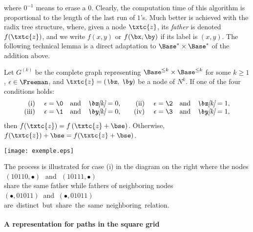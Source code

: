 \noindent where $0^{-1}$ means to erase a $0$. Clearly, the computation time of this algorithm  is proportional to the length of the last run of $1$'s.  Much better is achieved with  the radix tree structure, where, given a node $\txtc{z}$, its {\em father} is denoted  $f(\txtc{z})$, and we write $f(x,y)$ or $f(\bx,\by)$ if its label is $(x,y)$.
The following technical lemma is a direct  adaptation to $\Base^*\times\Base^*$  of the addition above.
\begin{lemma}\label{condition} Let $G^{(k)}$ be the complete graph representing $\Base^{\leq k}\times\Base^{\leq k}$ for some $k\geq 1$,  $\epsilon \in \Freeman$, and $\txtc{z} = (\emph{\bx, \by})$ be a node of $N^{k}$. If one of the four conditions holds:
\[\begin{array}{rlcccrlcc}
 \text{\rm(i) } &\epsilon = \0 & \text{\rm and} &  \emph{\bx[k]} = 0, & &
\text{\rm(ii) }  &\epsilon = \2 & \text{\rm and} & \emph{\bx[k]} = 1, \\
\text{\rm(iii) }  &\epsilon = \1 & \text{\rm and} & \emph{\by[k]} = 0, & &
\text{\rm(iv) }  &\epsilon = \3 & \text{\rm and} & \emph{\by[k]} = 1,
\end{array} \]
then $f(\txtc{z}) = f\left(\txtc{z} +\bse\right)$. Otherwise, $f(\txtc{z}) + \bse = f(\txtc{z} + \bse)$.
\end{lemma}
\medskip
\begin{floatingfigure}[h!r]{3in}
\centering
\texttt{[image: exemple.eps]}
\end{floatingfigure}
\noindent  The process is illustrated for case (i) in the diagram on the right
where the nodes\vspace{4pt} 
\hbox{$\,(10110, \bullet)~$ and  $\,(10111, \bullet)\,$}\medskip
\\
share the same father while fathers of neighboring nodes\medskip\\
\smallskip
 $(\bullet, 01011)~$ and $~(\bullet, 01011)$\\
\smallskip \hbox{are distinct but share the same neighboring relation.}


\paragraph{A representation for paths in the square grid}





